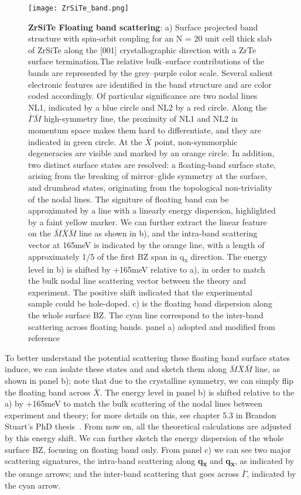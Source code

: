 \begin{figure}
	\texttt{[image: ZrSiTe\_band.png]} 
	\centering
	\captionsetup{width=1.5\textwidth}
	\caption[\textbf{ZrSiTe Floating band scattering}]{\textbf{ZrSiTe Floating band scattering}: a) Surface projected band structure with spin-orbit coupling for an N = 20 unit cell thick slab of ZrSiTe along the [001] crystallographic direction with a ZrTe surface termination.The relative bulk–surface contributions of the bands are represented by the grey–purple color scale. Several salient electronic features are identified in the band structure and are color coded accordingly. Of particular significance are two nodal lines NL1, indicated by a blue circle and NL2 by a red circle. Along the $\bar{\Gamma}\bar{M}$ high-symmetry line, the proximity of NL1 and NL2 in momentum space makes them hard to differentiate, and they are indicated in green circle. At the $\bar{X}$ point, non-symmorphic degeneracies are visible and marked by an orange circle. In addition, two distinct surface states are resolved: a floating-band surface state, arising from the breaking of mirror–glide symmetry at the surface, and drumhead states, originating from the topological non-triviality of the nodal lines. The signiture of floating band can be approximated by a line with a linearly energy dispersion, highlighted by a faint yellow marker. We can further extract the linear feature on the $\bar{M}\bar{X}\bar{M}$ line as shown in b), and the intra-band scattering vector at 165meV is indicated by the orange line, with a length of approximately 1/5 of the first \ac{BZ} span in q\textsubscript{x} direction. The energy level in b) is shifted by +165meV relative to a), in order to match the bulk nodal line scattering vector between the theory and experiment. The positive shift indicated that the experimental sample could be hole-doped. c) is the floating band dispersion along the whole surface \ac{BZ}. The cyan line correspond to the inter-band scattering across floating bands. 
		panel a) adopted and modified from reference \cite{stuartQuasiparticleInterferenceObservation2022}}
	\label{fig:ZrSiTe_floatingband}
\end{figure}

To better understand the potential scattering these floating band surface states induce, we can isolate these states and and sketch them along $\bar{M}\bar{X}\bar{M}$ line, as shown in panel b); note that due to the crystalline symmetry, we can simply flip the floating band across $\bar{X}$. The energy level in panel b) is shifted relative to the a) by +165meV to match the bulk scattering of the nodal lines between experiment and theory; for more details on this, see chapter 5.3 in Brandon Stuart's PhD thesis~\cite{stuartScanningTunnellingMicroscopy2021}. From now on, all the theoretical calculations are adjusted by this energy shift. We can further sketch the energy dispersion of the whole surface \ac{BZ}, focusing on floating band only. From panel c) we can see two major scattering signatures, the intra-band scattering along \textbf{q\textsubscript{x}} and \textbf{q\textsubscript{x}}, as indicated by the orange arrows; and the inter-band scattering that goes across $\bar{\Gamma}$, indicated by the cyan arrow. 

